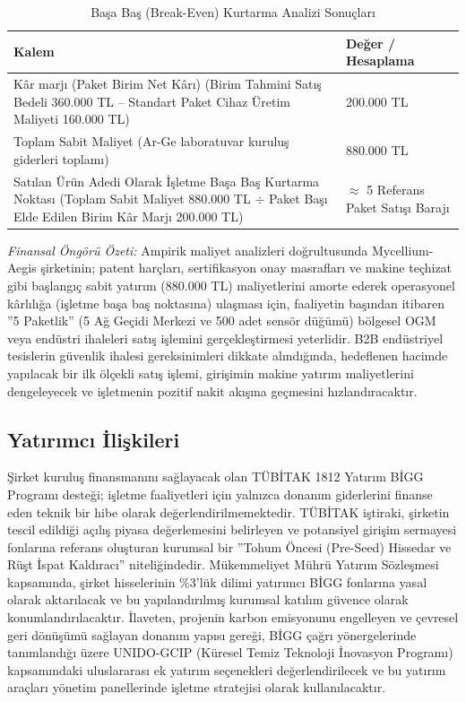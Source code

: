 \documentclass[11pt,a4paper]{article}
\begin{document}
\begin{table}[h]
\centering
\caption{Başa Baş (Break-Even) Kurtarma Analizi Sonuçları}
\begin{tabular}{p{9.5cm}p{4.5cm}}
\toprule
\textbf{Kalem} & \textbf{Değer / Hesaplama}\\
\midrule
Kâr marjı (Paket Birim Net Kârı) (Birim Tahmini Satış Bedeli 360.000 TL -- Standart Paket Cihaz Üretim Maliyeti 160.000 TL) & 200.000 TL\\
Toplam Sabit Maliyet (Ar-Ge laboratuvar kuruluş giderleri toplamı) & 880.000 TL\\
Satılan Ürün Adedi Olarak İşletme Başa Baş Kurtarma Noktası (Toplam Sabit Maliyet 880.000 TL $\div$ Paket Başı Elde Edilen Birim Kâr Marjı 200.000 TL) & $\approx$ 5 Referans Paket Satışı Barajı\\
\bottomrule
\end{tabular}
\end{table}

\textit{Finansal Öngörü Özeti:} Ampirik maliyet analizleri doğrultusunda Mycellium-Aegis şirketinin; patent harçları, sertifikasyon onay masrafları ve makine teçhizat gibi başlangıç sabit yatırım (880.000 TL) maliyetlerini amorte ederek operasyonel kârlılığa (işletme başa baş noktasına) ulaşması için, faaliyetin başından itibaren ''5 Paketlik'' (5 Ağ Geçidi Merkezi ve 500 adet sensör düğümü) bölgesel OGM veya endüstri ihaleleri satış işlemini gerçekleştirmesi yeterlidir. B2B endüstriyel tesislerin güvenlik ihalesi gereksinimleri dikkate alındığında, hedeflenen hacimde yapılacak bir ilk ölçekli satış işlemi, girişimin makine yatırım maliyetlerini dengeleyecek ve işletmenin pozitif nakit akışına geçmesini hızlandıracaktır.

\subsection{Yatırımcı İlişkileri}

Şirket kuruluş finansmanını sağlayacak olan TÜBİTAK 1812 Yatırım BİGG Programı desteği; işletme faaliyetleri için yalnızca donanım giderlerini finanse eden teknik bir hibe olarak değerlendirilmemektedir. TÜBİTAK iştiraki, şirketin tescil edildiği açılış piyasa değerlemesini belirleyen ve potansiyel girişim sermayesi fonlarına referans oluşturan kurumsal bir ''Tohum Öncesi (Pre-Seed) Hissedar ve Rüşt İspat Kaldıracı'' niteliğindedir. Mükemmeliyet Mührü Yatırım Sözleşmesi kapsamında, şirket hisselerinin \%3'lük dilimi yatırımcı BİGG fonlarına yasal olarak aktarılacak ve bu yapılandırılmış kurumsal katılım güvence olarak konumlandırılacaktır. İlaveten, projenin karbon emisyonunu engelleyen ve çevresel geri dönüşümü sağlayan donanım yapısı gereği, BİGG çağrı yönergelerinde tanımlandığı üzere UNIDO-GCIP (Küresel Temiz Teknoloji İnovasyon Programı) kapsamındaki uluslararası ek yatırım seçenekleri değerlendirilecek ve bu yatırım araçları yönetim panellerinde işletme stratejisi olarak kullanılacaktır.
\end{document}
